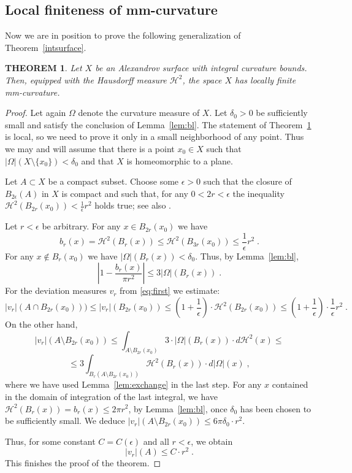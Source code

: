 \documentclass[12pt,leqno,intlimits]{amsart}
\numberwithin{equation}{section}
\newtheorem{thm}{THEOREM}[section]
\theoremstyle{definition}
\theoremstyle{remark}
\newcommand{\tref}[1]{Theorem~\ref{#1}}
\newcommand{\lref}[1]{Lemma~\ref{#1}}
\begin{document}
 \subsection{Local finiteness of mm-curvature}
 Now we are in position to prove
 the following generalization of  \tref{intsurface}.
 \begin{thm}\label{intsurface1}
 Let $X$ be an Alexandrov surface with integral curvature bounds.  Then,  equipped with the Hausdorff measure $\mathcal H^2$, the space $X$ has locally finite mm-curvature.
  \end{thm}
 \begin{proof}
 Let again $\Omega$ denote the curvature measure of $X$. Let $\delta _0>0$ be sufficiently small and satisfy the conclusion of  \lref{lem:bl}.
 The statement  of \tref{intsurface1} is local, so we need to prove it only in a small neighborhood of any point.
 Thus we may and will assume that there is a point $x_0\in X$
 such that $| \Omega| (X \setminus  \{ x_0 \} )< \delta _0$ and that $X$ is homeomorphic to a plane.



Let  $A\subset X$  be a compact subset. Choose some $\epsilon >0$ such that the closure of  $B_{2\epsilon} (A)$ in $X$ is compact and such that,
for any $0<2r<\epsilon$  the inequality  $\mathcal H^2 (B_{2r}(x_0)) < \frac 1 {\epsilon} r^2$ holds true; see also \cite[Lemma 8.1.1]{Reshetnyak-GeomIV}.

 Let  $r<\epsilon$    be arbitrary.
 For any $x\in B_{2r} (x_0)$ we have $$b_r (x)  =\mathcal H^2 (B_r (x)) \leq \mathcal H^2 (B_{3r} (x_0)) \leq \frac 1 {\epsilon} r^2 \; .$$
For any $x\notin B_{r} (x_0)$ we have $| \Omega |(B_r (x)) < \delta _0$. Thus, by Lemma~\ref{lem:bl}, $$|1-\frac {b_r(x)}  {\pi r^2} | \leq 3 |\Omega | ( B_{r} (x))\; .$$
For the  deviation measures $v_r$ from \eqref{eq:first} we estimate:
 $$|v_r| (A\cap B_{2r} (x_0))) \leq |v_r| (B_{2r} (x_0))  \leq (1+ \frac 1 {\epsilon}) \cdot \mathcal H^2 (B_{2r} (x_0)) \leq
 (1+ \frac 1 {\epsilon}) \cdot \frac 1 {\epsilon} r^2 \; .$$
On the other hand,
$$|v_r| (A\setminus B_{2r} (x_0)) \leq \int _{A \setminus B_{2r} (x_0) } 3 \cdot |\Omega| (B_r (x)) \cdot  d\mathcal H^2 (x)  \leq $$
$$\leq 3 \int _{B_r (A\setminus B_{2r} (x_0))} \mathcal H^2 (B_r(x))  \cdot d|\Omega | (x) \; ,$$
where we have used \lref{lem:exchange} in the last step.
 For any $x$  contained in the domain of integration of the last integral, we have $\mathcal H^2 (B_r(x))  =b_r (x) \leq 2\pi  r^2$, by \lref{lem:bl}, once $\delta _0$ has been chosen to be sufficiently  small.
We deduce $|v_r| (A\setminus B_{2r} (x_0)) \leq 6 \pi \delta _0 \cdot r^2$.

Thus, for some constant $C=C(\epsilon)$ and all $r<\epsilon$, we obtain
$$|v_r|(A) \leq C\cdot r^2 \; .$$
This finishes the proof of the theorem.
\end{proof}
\end{document}
